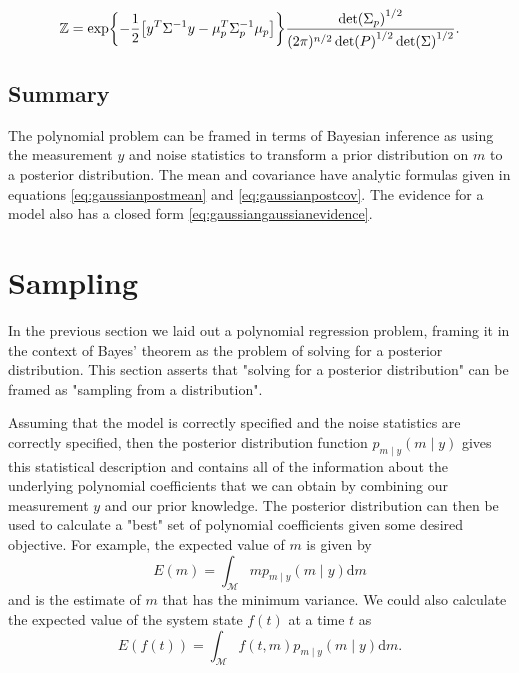 \documentclass[11pt]{article}
\begin{document}
	\begin{equation}
		\label{eq:gaussiangaussianevidence}
		\mathbb{Z} = \exp{-\frac{1}{2} \qty[y^{T} \Sigma^{-1} y -  \mu_p^T\Sigma_p^{-1}\mu_p]}\frac{\det(\Sigma_p)^{1/2}}{(2 \pi)^{n/2} \det(P)^{1/2} \det(\Sigma)^{1/2} } .
	\end{equation}



\subsection{Summary}

The polynomial problem can be framed in terms of Bayesian inference as using the measurement $y$ and noise statistics to transform a prior distribution on $m$ to a posterior distribution.
The mean and covariance have analytic formulas given in equations \eqref{eq:gaussianpostmean} and \eqref{eq:gaussianpostcov}.
The evidence for a model also has a closed form \eqref{eq:gaussiangaussianevidence}. 


\section{Sampling}

In the previous section we laid out a polynomial regression problem, framing it in the context of Bayes' theorem as the problem of solving for a posterior distribution. This section asserts that "solving for a posterior distribution" can be framed as "sampling from a distribution".

Assuming that the model is correctly specified and the noise statistics are correctly specified, then the posterior distribution function $p_{m \mid y}(m \mid y)$ gives this statistical description and contains all of the information about the underlying polynomial coefficients that we can obtain by combining our measurement $y$ and our prior knowledge. The posterior distribution can then be used to calculate a "best" set of polynomial coefficients given some desired objective. For example, the expected value of $m$ is given by
\begin{equation}
E(m)=\int_{\mathcal{M}} m p_{m \mid y}(m \mid y) \mathrm{d} m
\end{equation}
and is the estimate of $m$ that has the minimum variance. We could also calculate the expected value of the system state $f(t)$ at a time $t$ as
\begin{equation}
E(f(t))=\int_{\mathcal{M}} f(t, m) p_{m \mid y}(m \mid y) \mathrm{d} m .
\end{equation}
\end{document}
